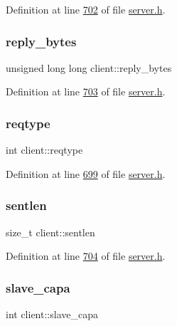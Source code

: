 Definition at line \hyperlink{server_8h_source_l00702}{702} of file \hyperlink{server_8h_source}{server.\+h}.

\mbox{\label{structclient_a86ec8e4ac30913b0abd614b0d7c91742}} 
\subsubsection{\texorpdfstring{reply\+\_\+bytes}{reply\_bytes}}
{\footnotesize\ttfamily unsigned long long client\+::reply\+\_\+bytes}



Definition at line \hyperlink{server_8h_source_l00703}{703} of file \hyperlink{server_8h_source}{server.\+h}.

\mbox{\label{structclient_ab2e2a56c21440e3269fa0d6029faac06}} 
\subsubsection{\texorpdfstring{reqtype}{reqtype}}
{\footnotesize\ttfamily int client\+::reqtype}



Definition at line \hyperlink{server_8h_source_l00699}{699} of file \hyperlink{server_8h_source}{server.\+h}.

\mbox{\label{structclient_a9a3ef65699c16325e41c3f3416ae62f0}} 
\subsubsection{\texorpdfstring{sentlen}{sentlen}}
{\footnotesize\ttfamily size\+\_\+t client\+::sentlen}



Definition at line \hyperlink{server_8h_source_l00704}{704} of file \hyperlink{server_8h_source}{server.\+h}.

\mbox{\label{structclient_aa9c92fd1ef4933afee5f3b134bc27d43}} 
\subsubsection{\texorpdfstring{slave\+\_\+capa}{slave\_capa}}
{\footnotesize\ttfamily int client\+::slave\+\_\+capa}



